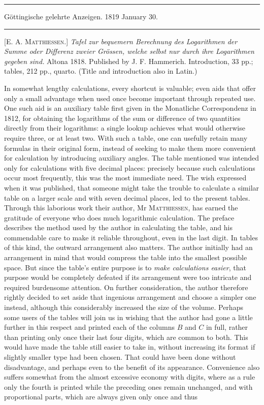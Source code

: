 \par{}\medskip\hrule\smallskip
\begin{center}
Göttingische gelehrte Anzeigen. 1819 January 30.
\end{center}
\smallskip\hrule\medskip

[E. A. \textsc{Matthiessen}.] \textit{Tafel zur bequemern Berechnung des Logarithmen der
Summe oder Differenz zweier Grössen, welche selbst nur durch ihre Logarithmen gegeben sind.} Altona 1818. Published by J. F. Hammerich. Introduction, 33 pp.; tables,
212 pp., quarto. (Title and introduction also in Latin.)

In somewhat lengthy calculations, every shortcut is valuable; even aids that offer only a small advantage when used once become important through repeated use. One such aid is an auxiliary table first given in the Monatliche Correspondenz in 1812, for obtaining the logarithms of the sum or difference of two quantities directly from their logarithms: a single lookup achieves what would otherwise require three, or at least two. With such a table, one can usefully retain many  formulas in their original form, instead of seeking to make them more convenient for calculation by introducing auxiliary angles. The table mentioned was intended only for calculations with five decimal places: precisely because such calculations occur most frequently, this was the most immediate need. The wish expressed when it was published, that someone might take the trouble to calculate a similar table on a larger scale and with seven decimal places, led to the present tables. Through this laborious work their author, Mr \textsc{Matthiessen}, has earned the gratitude of everyone who does much logarithmic calculation. The preface describes the method used by the author in calculating the table, and his commendable care to make it reliable throughout, even in the last digit. In tables of this kind, the outward arrangement also matters. The author initially had an arrangement in mind that would compress the table into the smallest possible space. But since the table's entire purpose is to \textit{make calculations easier}, that purpose would be completely defeated if its arrangement were too intricate and required burdensome attention. On further consideration, the author therefore rightly decided to set aside that ingenious arrangement and choose a simpler one instead, although this considerably increased the size of the volume. Perhaps some users of the tables will join us in wishing that the author had gone a little further in this respect and printed each of the columns \(B\) and \(C\) in full, rather than printing only once their last four digits, which are common to both. This would have made the table still easier to take in, without increasing its format if slightly smaller type had been chosen. That could have been done without disadvantage, and perhaps even to the benefit of its appearance. Convenience also suffers somewhat from the almost excessive economy with digits, where as a rule only the fourth is printed while the preceding ones remain unchanged, and with proportional parts, which are always given only once and thus 